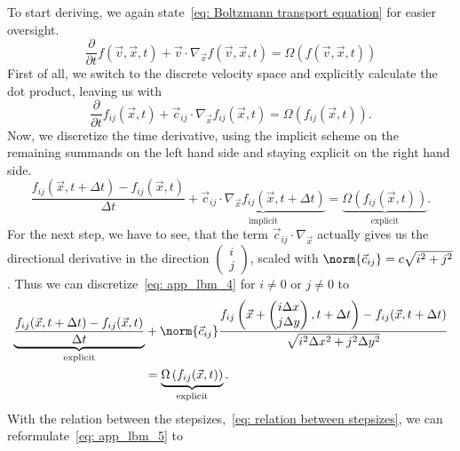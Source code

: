 To start deriving, we again state~\eqref{eq: Boltzmann transport equation} for easier oversight.
\begin{equation}
  \label{eq: app_lbm_2}
  \frac{\partial}{\partial t} f(\vec{v},\vec{x},t) + \vec{v} \cdot \nabla_{\vec{x}} f(\vec{v},\vec{x},t) = \Omega\left(f(\vec{v},\vec{x},t)\right)
\end{equation}
First of all, we switch to the discrete velocity space and explicitly calculate the dot product, leaving us with
\begin{equation}
  \label{eq: app_lbm_3}
  \frac{\partial}{\partial t} f_{ij}(\vec{x},t) + \vec{c}_{ij} \cdot \nabla_{\vec{x}} f_{ij}(\vec{x},t) = \Omega\left(f_{ij}(\vec{x},t)\right).
\end{equation}
Now, we discretize the time derivative, using the implicit scheme on the remaining summands on the left hand side and staying explicit on the right hand side.
\begin{equation}
  \label{eq: app_lbm_4}
  \frac{f_{ij}(\vec{x}, t+\Delta t) - f_{ij}(\vec{x}, t)}{\Delta t}
  +
  \underbrace {\vec{c}_{ij} \cdot \nabla_{\vec{x}} f_{ij}(\vec{x},t+\Delta t)
  }_{\text{implicit}}
   = \underbrace{\Omega\left(f_{ij}(\vec{x},t)\right)}_{\text{explicit}}.
\end{equation}
For the next step, we have to see, that the term $\vec{c}_{ij} \cdot \nabla_{\vec{x}}$ actually gives us the directional derivative in the direction $\begin{pmatrix}i\\j\end{pmatrix}$, scaled with $\norm{\vec{c}_{ij}}= c\sqrt{i^2 + j^2}$.
Thus we can discretize~\eqref{eq: app_lbm_4} for $i\neq 0$ or $j\neq 0$ to
\begin{equation}
  \label{eq: app_lbm_5}
  \begin{aligned}
    \underbrace{\frac{f_{ij}(\vec{x}, t+\Delta t) - f_{ij}(\vec{x}, t)}{\Delta t}}_{\text{explicit}}
    & + \norm{\vec{c}_{ij}}\frac{f_{ij}\left(\vec{x}+\begin{pmatrix}i\Delta x\\j\Delta y\end{pmatrix}, t+\Delta t\right) - f_{ij}(\vec{x}, t+\Delta t)}{\sqrt{i^2\Delta x^2 + j^2\Delta y^2}}
    \\&
    = \underbrace{\Omega\left(f_{ij}(\vec{x},t)\right)}_{\text{explicit}}.
  \end{aligned}
\end{equation}
With the relation between the stepsizes,~\eqref{eq: relation between stepsizes}, we can reformulate~\eqref{eq: app_lbm_5} to

